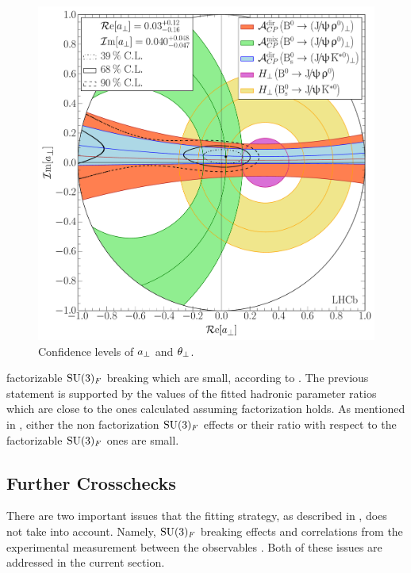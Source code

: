 \begin{figure}[!t]
  \centering
  \includegraphics[trim=0.0cm 0.0cm 0.0cm 0.0cm, clip=true,scale=0.39]{Figures/Chapter5/Penguin_Contribution_Re_vs_Im_allB2VV_Perp_withH.pdf}
  \caption{Confidence levels of $a_{\perp}$ and $\theta_{\perp}$.}
  \label{pengPlot_perp}
\end{figure}

\noindent factorizable $\mathrm{SU}(3)_F$ breaking which are small,
according to \cite{DeBruyn:2014oga,DeBruyn-thesis}. The previous statement is supported by the values of the fitted hadronic parameter
ratios which are close to the ones calculated assuming factorization holds. As mentioned in \cite{DeBruyn:2014oga,DeBruyn-thesis},
either the non factorization $\mathrm{SU}(3)_F$ effects or their ratio with respect to the factorizable $\mathrm{SU}(3)_F$
ones are small.

\subsection{Further Crosschecks}
There are two important issues that the fitting strategy, as described in ,
does not take into account. Namely, $\mathrm{SU}(3)_F$ breaking effects and correlations from the
experimental measurement between the observables . Both of these issues
are addressed in the current section.

